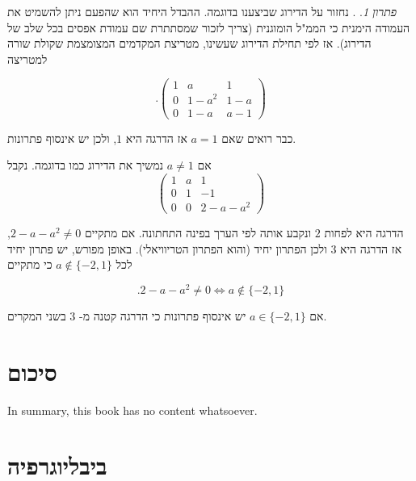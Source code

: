 \documentclass[
  hebrew,
  12pt,
  a4paper,
  oneside]{book}
\theoremstyle{definition}
\theoremstyle{remark}
\theoremstyle{plain}
\theoremstyle{remark}
\newtheorem*{solution}{פתרון}
\begin{document}
\begin{solution}
. נחזור על הדירוג שביצענו בדוגמה. ההבדל היחיד הוא שהפעם ניתן להשמיט את
העמודה הימנית כי הממ"ל הומוגנית (צריך לזכור שמסתתרת שם עמודת אפסים בכל
שלב של הדירוג). אז לפי תחילת הדירוג שעשינו, מטריצת המקדמים המצומצמת
שקולת שורה למטריצה

\[.\begin{pmatrix}
1 & a & 1  \\
0 & 1-a^2 & 1-a \\
0 & 1-a & a-1 
\end{pmatrix}\]

כבר רואים שאם \(a=1\) אז הדרגה היא \(1\), ולכן יש אינסוף פתרונות.

אם \(a\neq 1\) נמשיך את הדירוג כמו בדוגמה. נקבל \[\begin{pmatrix}
1 & a & 1  \\
0 & 1 & -1 \\
0 & 0 & 2-a-a^2 
\end{pmatrix}\]

הדרגה היא לפחות \(2\) ונקבע אותה לפי הערך בפינה התחתונה. אם מתקיים
\(2-a-a^2\neq 0\), אז הדרגה היא \(3\) ולכן הפתרון יחיד (והוא הפתרון
הטריוויאלי). באופן מפורש, יש פתרון יחיד לכל \(a\notin\{-2,1\}\) כי
מתקיים

\[.2-a-a^2\neq 0 \iff a\notin\{-2,1\}\]

אם \(a\in\{-2,1\}\) יש אינסוף פתרונות כי הדרגה קטנה מ- \(3\) בשני
המקרים.
\end{solution}

\backmatter


\chapter{סיכום}\label{ux5e1ux5d9ux5dbux5d5ux5dd}

In summary, this book has no content whatsoever.


\chapter*{ביבליוגרפיה}\label{ux5d1ux5d9ux5d1ux5dcux5d9ux5d5ux5d2ux5e8ux5e4ux5d9ux5d4}


\label{refs}


\backmatter
\end{document}
